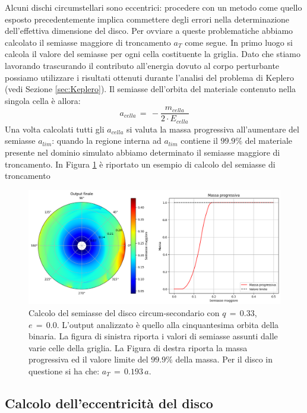 Alcuni dischi circumstellari sono eccentrici: procedere con un metodo come quello esposto precedentemente implica commettere degli errori nella determinazione dell'effettiva dimensione del disco. Per ovviare a queste problematiche abbiamo calcolato il semiasse maggiore di troncamento $a_T$ come segue. In primo luogo si calcola il valore del semiasse per ogni cella costituente la griglia. Dato che stiamo lavorando trascurando il contributo all'energia dovuto al corpo perturbante possiamo utilizzare i risultati ottenuti durante l'analisi del problema di Keplero (vedi Sezione \ref{sec:Keplero}). Il semiasse dell'orbita del materiale contenuto nella singola cella è allora:
\begin{equation}
a_{cella}\,=\,-\frac{m_{cella}}{2\cdot E_{cella}}
\label{eq:sax_cella}
\end{equation}
Una volta calcolati tutti gli $a_{cella}$ si valuta la massa progressiva all'aumentare del semiasse $a_{lim}$: quando la regione interna ad $a_{lim}$ contiene il $99.9\%$ del materiale presente nel dominio simulato abbiamo determinato il semiasse maggiore di troncamento.
In Figura \ref{fig:cal_sax} è riportato un esempio di calcolo del semiasse di troncamento

\begin{figure}[H]
    \centering
    \includegraphics[width=\textwidth]{Immagini/Simulazioni/cal_sax.png}
    \caption{Calcolo del semiasse del disco circum-secondario con $q\,=\,0.33$, $e\,=\,0.0$. L'output analizzato è quello alla cinquantesima orbita della binaria. La figura di sinistra riporta i valori di semiasse assunti dalle varie celle della griglia. La Figura di destra riporta la massa progressiva ed il valore limite del $99.9\%$ della massa. Per il disco in questione si ha che: $a_T\,=\,0.193\,a$.}
    \label{fig:cal_sax}
\end{figure}

\subsection{Calcolo dell'eccentricità del disco}


